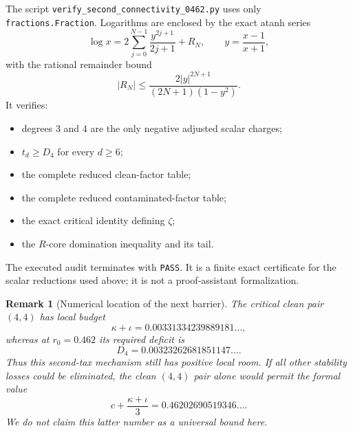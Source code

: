 \documentclass[11pt]{article}
\newtheorem{remark}[theorem]{Remark}
\begin{document}
The script \texttt{verify\_second\_connectivity\_0462.py} uses only
\texttt{fractions.Fraction}.  Logarithms are enclosed by the exact atanh series
\[
 \log x
 =2\sum_{j=0}^{N-1}\frac{y^{2j+1}}{2j+1}+R_N,
 \qquad
 y=\frac{x-1}{x+1},
\]
with the rational remainder bound
\[
 |R_N|
 \le
 \frac{2|y|^{2N+1}}{(2N+1)(1-y^2)}.
\]
It verifies:
\begin{itemize}
 \item degrees $3$ and $4$ are the only negative adjusted scalar charges;
 \item $t_d\ge D_4$ for every $d\ge6$;
 \item the complete reduced clean-factor table;
 \item the complete reduced contaminated-factor table;
 \item the exact critical identity defining $\zeta$;
 \item the $R$-core domination inequality and its tail.
\end{itemize}
The executed audit terminates with \texttt{PASS}.  It is a finite exact certificate for the scalar reductions used above; it is not a proof-assistant formalization.

\begin{remark}[Numerical location of the next barrier]
The critical clean pair $(4,4)$ has local budget
\[
 \kappa+\iota=0.00331334239889181\ldots,
\]
whereas at $r_0=0.462$ its required deficit is
\[
 D_4=0.00323262681851147\ldots .
\]
Thus this second-tax mechanism still has positive local room.  If all other stability losses could be eliminated, the clean $(4,4)$ pair alone would permit the formal value
\[
 c+\frac{\kappa+\iota}{3}
 =0.46202690519346\ldots .
\]
We do not claim this latter number as a universal bound here.
\end{remark}
\end{document}
